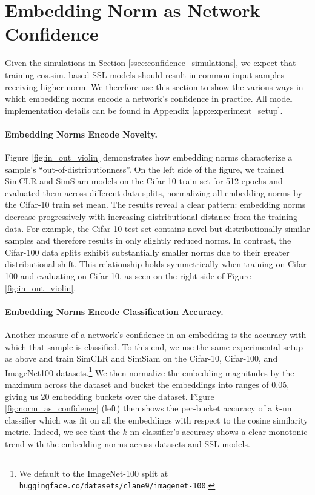 

\section{Embedding Norm as Network Confidence}
\label{sec:norm_confidence}

Given the simulations in Section \ref{ssec:confidence_simulations}, we expect that training cos.sim.-based SSL models should result in common input samples receiving higher norm. We therefore use this section to show the various ways in which embedding norms encode a network's confidence in practice. All model implementation details can be found in Appendix \ref{app:experiment_setup}.

\paragraph{Embedding Norms Encode Novelty.} 
Figure \ref{fig:in_out_violin} demonstrates how embedding norms characterize a sample's ``out-of-distributionness''. On the left side of the figure, we trained SimCLR and SimSiam models on the Cifar-10 train set for 512 epochs and evaluated them across different data splits, normalizing all embedding norms by the Cifar-10 train set mean. The results reveal a clear pattern: embedding norms decrease progressively with increasing distributional distance from the training data. For example, the Cifar-10 test set contains novel but distributionally similar samples and therefore results in only slightly reduced norms. In contrast, the Cifar-100 data splits exhibit substantially smaller norms due to their greater distributional shift. This relationship holds symmetrically when training on Cifar-100 and evaluating on Cifar-10, as seen on the right side of Figure \ref{fig:in_out_violin}.

\paragraph{Embedding Norms Encode Classification Accuracy.} Another measure of a network's confidence in an embedding is the accuracy with which that sample is classified. To this end, we use the same experimental setup as above and train SimCLR and SimSiam on the Cifar-10, Cifar-100, and ImageNet100 datasets.\footnote{We default to the ImageNet-100 split \citep{understanding_contr_learn} at \texttt{huggingface.co/datasets/clane9/imagenet-100}.} We then normalize the embedding magnitudes by the maximum across the dataset and bucket the embeddings into ranges of $0.05$, giving us 20 embedding buckets over the dataset. Figure \ref{fig:norm_as_confidence} (left) then shows the per-bucket accuracy of a $k$-nn classifier which was fit on all the embeddings with respect to the cosine similarity metric. Indeed, we see that the $k$-nn classifier's accuracy shows a clear monotonic trend with the embedding norms across datasets and SSL models. 

